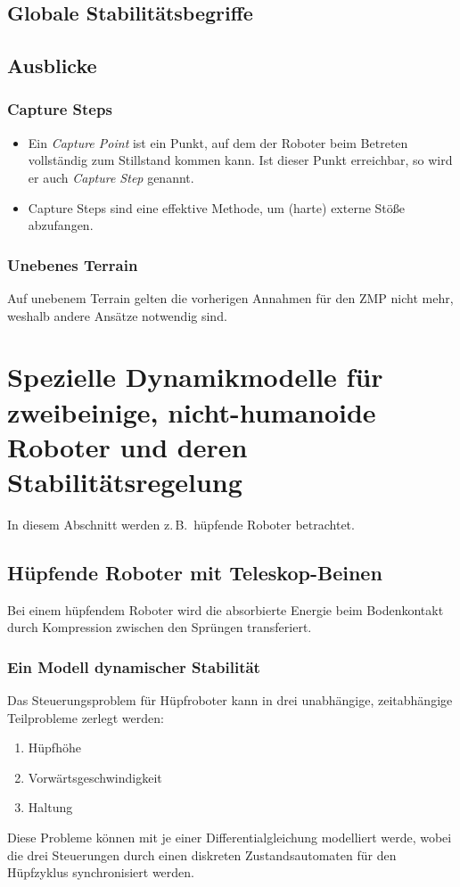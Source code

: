 \documentclass[a4paper, 11pt, accentcolor = tud3b]{tudreport}
\newcommand{\zB}{z.\,B.~}
\begin{document}
			\subsection{Globale Stabilitätsbegriffe} %

			\subsection{Ausblicke}
				\subsubsection{Capture Steps}
					\begin{itemize}
						\item Ein \emph{Capture Point} ist ein Punkt, auf dem der Roboter beim Betreten vollständig zum Stillstand kommen kann. Ist dieser Punkt erreichbar, so wird er auch \emph{Capture Step} genannt.
						\item Capture Steps sind eine effektive Methode, um (harte) externe Stöße abzufangen.
					\end{itemize}

				\subsubsection{Unebenes Terrain}
					Auf unebenem Terrain gelten die vorherigen Annahmen für den ZMP nicht mehr, weshalb andere Ansätze notwendig sind.

		\section{Spezielle Dynamikmodelle für zweibeinige, nicht-humanoide Roboter und deren Stabilitätsregelung}
			In diesem Abschnitt werden \zB hüpfende Roboter betrachtet.

			\subsection{Hüpfende Roboter mit Teleskop-Beinen}
				Bei einem hüpfendem Roboter wird die absorbierte Energie beim Bodenkontakt durch Kompression zwischen den Sprüngen transferiert.

				\subsubsection{Ein Modell dynamischer Stabilität}
					Das Steuerungsproblem für Hüpfroboter kann in drei unabhängige, zeitabhängige Teilprobleme zerlegt werden:
					\begin{enumerate}
						\item Hüpfhöhe
						\item Vorwärtsgeschwindigkeit
						\item Haltung
					\end{enumerate}
					Diese Probleme können mit je einer Differentialgleichung modelliert werde, wobei die drei Steuerungen durch einen diskreten Zustandsautomaten für den Hüpfzyklus synchronisiert werden.
					
\end{document}
